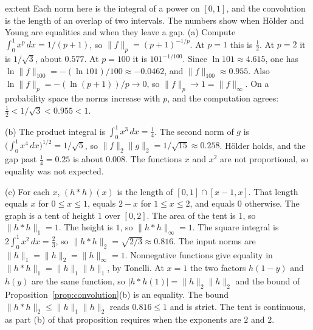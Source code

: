 \begin{solution}{ex:tent}
\idea Each norm here is the integral of a power on $[0,1]$, and the convolution is the length of an overlap of two intervals. The numbers show when Hölder and Young are equalities and when they leave a gap.
\writeup (a) Compute $\int_0^1 x^p\,dx=1/(p+1)$, so $\|f\|_p=(p+1)^{-1/p}$. At $p=1$ this is $\frac12$. At $p=2$ it is $1/\sqrt3$, about $0.577$. At $p=100$ it is $101^{-1/100}$. Since $\ln101\approx4.615$, one has $\ln\|f\|_{100}=-(\ln101)/100\approx-0.0462$, and $\|f\|_{100}\approx0.955$. Also $\ln\|f\|_p=-(\ln(p+1))/p\to0$, so $\|f\|_p\to1=\|f\|_\infty$. On a probability space the norms increase with $p$, and the computation agrees: $\frac12<1/\sqrt3<0.955<1$.

(b) The product integral is $\int_0^1 x^3\,dx=\frac14$. The second norm of $g$ is $\bigl(\int_0^1 x^4\,dx\bigr)^{1/2}=1/\sqrt5$, so $\|f\|_2\|g\|_2=1/\sqrt{15}\approx0.258$. Hölder holds, and the gap past $\frac14=0.25$ is about $0.008$. The functions $x$ and $x^2$ are not proportional, so equality was not expected.

(c) For each $x$, $(h*h)(x)$ is the length of $[0,1]\cap[x-1,x]$. That length equals $x$ for $0\le x\le1$, equals $2-x$ for $1\le x\le2$, and equals $0$ otherwise. The graph is a tent of height $1$ over $[0,2]$. The area of the tent is $1$, so $\|h*h\|_1=1$. The height is $1$, so $\|h*h\|_\infty=1$. The square integral is $2\int_0^1 x^2\,dx=\frac23$, so $\|h*h\|_2=\sqrt{2/3}\approx0.816$. The input norms are $\|h\|_1=\|h\|_2=\|h\|_\infty=1$. Nonnegative functions give equality in $\|h*h\|_1=\|h\|_1\|h\|_1$, by Tonelli. At $x=1$ the two factors $h(1-y)$ and $h(y)$ are the same function, so $|h*h(1)|=\|h\|_2\|h\|_2$ and the bound of Proposition~\ref{prop:convolution}(b) is an equality. The bound $\|h*h\|_2\le\|h\|_1\|h\|_2$ reads $0.816\le1$ and is strict. The tent is continuous, as part (b) of that proposition requires when the exponents are $2$ and $2$.
\end{solution}

